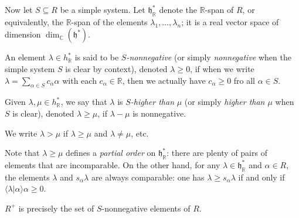 \documentclass[reqno]{amsart} 
\begin{document}
Now let $S \subseteq R$ be a simple system.  Let $\mathfrak{h}_\mathbb{R}^*$ denote the $\mathbb{R}$-span of $R$, or equivalently, the $\mathbb{R}$-span of the elements $\lambda_1,\dotsc,\lambda_n$; it is a real vector space of dimension $\dim_\mathbb{C}(\mathfrak{h}^*)$.
\begin{definition}\label{defn:partial-order-induced-by-simple-system}
  An element $\lambda \in h_\mathbb{R}^*$ is said to be \emph{$S$-nonnegative} (or simply \emph{nonnegative} when the simple system $S$ is clear by context), denoted $\lambda \geq 0$, if when we write $\lambda = \sum_{\alpha \in S} c_\alpha \alpha$ with each $c_\alpha \in \mathbb{R}$, then we actually have $c_\alpha \geq 0$ fro all $\alpha \in S$.

  Given $\lambda, \mu \in h_\mathbb{R}^*$, we say that $\lambda$ is \emph{$S$-higher than} $\mu$ (or simply \emph{higher than $\mu$} when $S$ is clear), denoted $\lambda \geq \mu$, if $\lambda - \mu$ is nonnegative.

  We write $\lambda > \mu$ if $\lambda \geq \mu$ and $\lambda \neq \mu$, etc.
\end{definition}
\begin{remark}\label{rmk-partial-order-but-can-compare-after-refelcting}
  Note that $\lambda \geq \mu$ defines a \emph{partial order} on $\mathfrak{h}_\mathbb{R}^*$: there are plenty of pairs of elements that are incomparable.  On the other hand, for any $\lambda \in \mathfrak{h}_\mathbb{R}^*$ and $\alpha \in R$, the elements $\lambda$ and $s_\alpha \lambda$ are always comparable: one has $\lambda \geq s_\alpha \lambda$ if and only if $\langle \lambda|\alpha \rangle \alpha \geq 0$.
\end{remark}
\begin{example}
  $R^+$ is precisely the set of $S$-nonnegative elements of $R$.
\end{example}
\end{document}

